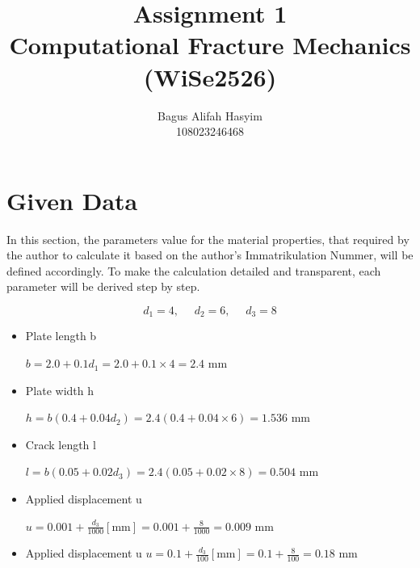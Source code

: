 \documentclass[12pt]{article}
\title{Assignment 1 \\ \large Computational Fracture Mechanics (WiSe2526)}
\author{Bagus Alifah Hasyim \\ 108023246468}
\date{}
\begin{document}
\maketitle

\section*{Given Data}
\hspace*{2em}In this section, the parameters value for the material properties, 
that required by the author to calculate it based on the author's Immatrikulation Nummer, will be defined accordingly. To make
the calculation detailed and transparent, each parameter will be derived step by step. 

\begin{equation}
    d_1 = 4, \text{   }\text{   } d_2 = 6, \text{   }\text{   } d_3 = 8
\end{equation}

\vspace{1em}
\begin{tcolorbox}[title=Parameter for 1st question]
  \begin{itemize}
    \item Plate length b
    
    $b = 2.0 + 0.1d_1 = 2.0 + 0.1 \times 4 = 2.4 \text{ mm}$
    \item Plate width h 
    
    $h = b(0.4 + 0.04d_2) = 2.4(0.4 + 0.04 \times 6) = 1.536 \text{ mm}$
    \item Crack length l
    
    $l = b(0.05 + 0.02d_3) = 2.4(0.05 + 0.02 \times 8) = 0.504 \text{ mm}$
    \item Applied displacement u 
    
    $u = 0.001 + \frac{d_3}{1000} [\text{mm}] = 0.001 + \frac{8}{1000} = 0.009 \text{ mm}$  
\end{itemize}
\end{tcolorbox}


\vspace{1em}
\begin{tcolorbox}[title=Parameter for 2nd question]
  \begin{itemize}
    \item Applied displacement u
    $u = 0.1 + \frac{d_3}{100}[\text{mm}] = 0.1 + \frac{8}{100} = 0.18 \text{ mm}$ 
\end{itemize}
\end{tcolorbox}
\vspace{1em}
\end{document}
